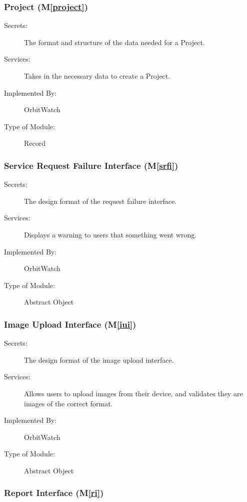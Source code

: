 \documentclass[12pt, titlepage]{article}
\newcommand{\mref}[1]{M\ref{#1}}
\begin{document}
\subsubsection{Project (\mref{project})}

\begin{description}
\item[Secrets:]The format and structure of the data needed for a Project.
\item[Services:] Takes in the necessary data to create a Project.
\item[Implemented By:] OrbitWatch
\item[Type of Module:] Record
\end{description}

\subsubsection{Service Request Failure Interface (\mref{srfi})}

\begin{description}
\item[Secrets:]The design format of the request failure interface.
\item[Services:] Displays a warning to users that something went wrong.
\item[Implemented By:] OrbitWatch
\item[Type of Module:] Abstract Object
\end{description}

\subsubsection{Image Upload Interface (\mref{iui})}

\begin{description}
\item[Secrets:]The design format of the image upload interface.
\item[Services:] Allows users to upload images from their device, and validates they are images of the correct format.
\item[Implemented By:] OrbitWatch
\item[Type of Module:] Abstract Object
\end{description}

\subsubsection{Report Interface (\mref{ri})}
\end{document}
